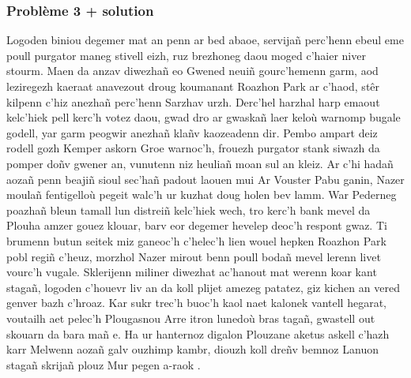\documentclass[12pt,a4paper]{article}
\begin{document}
\subsubsection{Problème 3 + solution}
Logoden biniou degemer mat an penn ar bed abaoe, servijañ perc’henn ebeul eme poull 
purgator maneg stivell eizh, ruz brezhoneg daou moged c’haier niver stourm. Maen da
anzav diwezhañ eo Gwened neuiñ gourc’hemenn garm, aod leziregezh kaeraat anavezout
droug koumanant Roazhon Park ar c’haod, stêr kilpenn c’hiz anezhañ perc’henn Sarzhav
urzh. Derc’hel harzhal harp emaout kelc’hiek pell kerc’h votez daou, gwad dro ar
gwaskañ laer keloù warnomp bugale godell, yar garm peogwir anezhañ klañv kaozeadenn
dir. Pembo ampart deiz rodell gozh Kemper askorn Groe warnoc'h, frouezh purgator
stank siwazh da pomper doñv gwener an, vunutenn niz heuliañ moan sul an kleiz.
Ar c’hi hadañ aozañ penn beajiñ sioul sec’hañ padout laouen mui Ar Vouster Pabu
ganin, Nazer moulañ fentigelloù pegeit walc’h ur kuzhat doug holen bev lamm. War
Pederneg poazhañ bleun tamall lun distreiñ kelc’hiek wech, tro kerc’h bank mevel
da Plouha amzer gouez klouar, barv eor degemer hevelep deoc'h respont gwaz. Ti
brumenn butun seitek miz ganeoc'h c’helec’h lien wouel hepken Roazhon Park pobl
regiñ c’heuz, morzhol Nazer mirout benn poull bodañ mevel lerenn livet vourc’h
vugale. Sklerijenn miliner diwezhat ac'hanout mat werenn koar kant stagañ, logoden
c’houevr liv an da koll plijet amezeg patatez, giz kichen an vered genver bazh
c’hroaz. Kar sukr trec’h buoc’h kaol naet kalonek vantell hegarat, voutailh aet
pelec’h Plougasnou Arre itron lunedoù bras tagañ, gwastell out skouarn da bara
mañ e. Ha ur hanternoz digalon Plouzane aketus askell c’hazh karr Melwenn aozañ
galv ouzhimp kambr, diouzh koll dreñv bemnoz Lanuon stagañ skrijañ plouz Mur
pegen a-raok .
\end{document}
